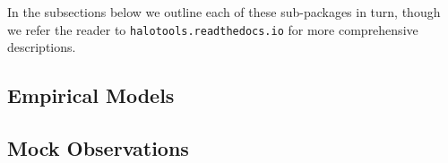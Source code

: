 \documentclass[usenatbib,usegraphicx,letterpaper]{mn2e}
\begin{document}
In the subsections below we outline each of these sub-packages in turn, though we refer the reader to {\tt halotools.readthedocs.io} for more comprehensive descriptions. 

\subsection{Empirical Models}
\label{subsection:empirical_models}

\subsection{Mock Observations}
\label{subsection:mock_observables}

\end{document}
